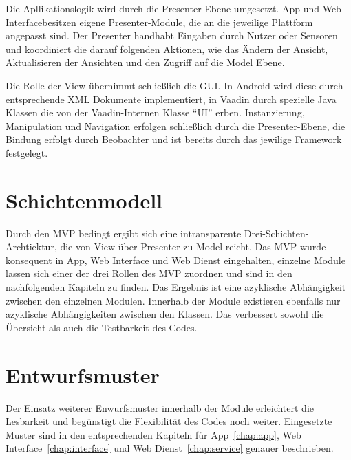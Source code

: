 Die Apllikationslogik wird durch die Presenter-Ebene umgesetzt. App und Web Interfacebesitzen eigene Presenter-Module, die an die jeweilige Plattform angepasst sind. Der Presenter handhabt Eingaben durch Nutzer oder Sensoren und koordiniert die darauf folgenden Aktionen, wie das Ändern der Ansicht, Aktualisieren der Ansichten und den Zugriff auf die Model Ebene.\newline\par 

Die Rolle der View übernimmt schließlich die GUI. In Android wird diese durch entsprechende XML Dokumente implementiert, in Vaadin durch spezielle Java Klassen die von der Vaadin-Internen Klasse ``UI'' erben. Instanzierung, Manipulation und Navigation erfolgen schließlich durch die Presenter-Ebene, die Bindung erfolgt durch Beobachter und ist bereits durch das jewilige Framework festgelegt.

\section{Schichtenmodell}
Durch den MVP bedingt ergibt sich eine intransparente Drei-Schichten-Archtiektur, die von View über Presenter zu Model reicht. Das MVP wurde konsequent in App, Web Interface und Web Dienst eingehalten, einzelne Module lassen sich einer der drei Rollen des MVP zuordnen und sind in den nachfolgenden Kapiteln zu finden. Das Ergebnis ist eine azyklische Abhängigkeit zwischen den einzelnen Modulen.\newline
Innerhalb der Module existieren ebenfalls nur azyklische Abhängigkeiten zwischen den Klassen. Das verbessert sowohl die Übersicht als auch die Testbarkeit des Codes.

\section{Entwurfsmuster}
Der Einsatz weiterer Enwurfsmuster innerhalb der Module erleichtert die Lesbarkeit und begünstigt die Flexibilität des Codes noch weiter. Eingesetzte Muster sind in den entsprechenden Kapiteln für App~\eqref{chap:app}, Web Interface~\eqref{chap:interface} und Web Dienst~\eqref{chap:service} genauer beschrieben.